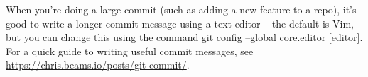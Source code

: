 \documentclass[11pt, a4paper, english]{article}
\newenvironment{wrapbox}[1][r]
	{\wrapfigure{#1}{0.35\textwidth}\tcolorbox}
	{\endtcolorbox\endwrapfigure}
\begin{document}
\begin{wrapbox} 
When you're doing a large commit (such as adding a new feature to a repo), it’s good to write a longer commit message using a text editor – the default is Vim, but you can change this using the command git config –global core.editor [editor]. For a quick guide to writing useful commit messages, see \url{https://chris.beams.io/posts/git-commit/}.
\end{wrapbox}
\end{document}
